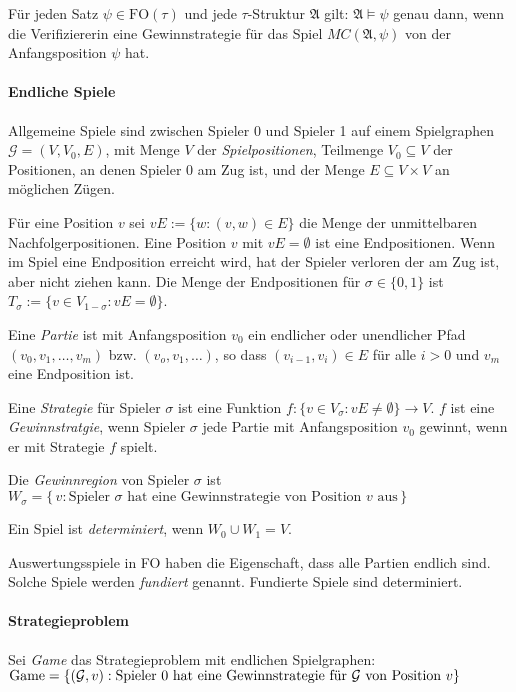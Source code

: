 \documentclass[a4paper,parskip=half*,DIV=15,fontsize=11pt]{scrartcl}
\newcommand{\A}{\mathfrak{A}}
\newcommand{\FO}{\mathrm{FO}}
\begin{document}
Für jeden Satz $\psi \in \FO(\tau)$ und jede $\tau$-Struktur $\A$ gilt: $\A \models \psi$ genau dann, wenn die Verifiziererin eine Gewinnstrategie für das Spiel $MC(\A,\psi)$ von der Anfangsposition $\psi$ hat.

\paragraph{Endliche Spiele} Allgemeine Spiele sind zwischen Spieler 0 und Spieler 1 auf einem Spielgraphen $\mathcal{G}=(V,V_0,E)$, mit Menge $V$ der \emph{Spielpositionen}, Teilmenge $V_0 \subseteq V$ der Positionen, an denen Spieler 0 am Zug ist, und der Menge $E \subseteq V \times V$ an möglichen Zügen.

Für eine Position $v$ sei $vE:=\{w:(v,w)\in E\}$ die Menge der unmittelbaren Nachfolgerpositionen. Eine Position $v$ mit $vE=\emptyset$ ist eine Endpositionen. Wenn im Spiel eine Endposition erreicht wird, hat der Spieler verloren der am Zug ist, aber nicht ziehen kann. Die Menge der Endpositionen für $\sigma \in \{0,1\}$ ist $T_{\sigma}:=\{v \in V_{1-\sigma}:vE=\emptyset\}$.

Eine \emph{Partie} ist mit Anfangsposition $v_0$ ein endlicher oder unendlicher Pfad $(v_0,v_1,\ldots,v_m)$ bzw. $(v_o,v_1,\ldots)$, so dass $(v_{i-1},v_i) \in E$ für alle $i>0$ und $v_m$ eine Endposition ist.

Eine \emph{Strategie} für Spieler $\sigma$ ist eine Funktion $f:\{v \in V_{\sigma}:vE \ne \emptyset \}\rightarrow V$. $f$ ist eine \emph{Gewinnstratgie}, wenn Spieler $\sigma$ jede Partie mit Anfangsposition $v_0$ gewinnt, wenn er mit Strategie $f$ spielt.

Die \emph{Gewinnregion} von Spieler $\sigma$ ist $W_{\sigma}=\{\,v:\text{Spieler $\sigma$ hat eine Gewinnstrategie von Position $v$ aus}\,\}$

Ein Spiel ist \emph{determiniert}, wenn $W_0 \cup W_1=V$.

Auswertungsspiele in FO haben die Eigenschaft, dass alle Partien endlich sind. Solche Spiele werden \emph{fundiert} genannt. Fundierte Spiele sind determiniert.

\paragraph{Strategieproblem}
Sei \emph{Game} das Strategieproblem mit endlichen Spielgraphen:
$\mathrm{Game}=\{(\mathcal{G},v):\textnormal{Spieler }0\textnormal{ hat eine Gewinnstrategie für }\mathcal{G}\textnormal{ von Position }v\}$
\end{document}

